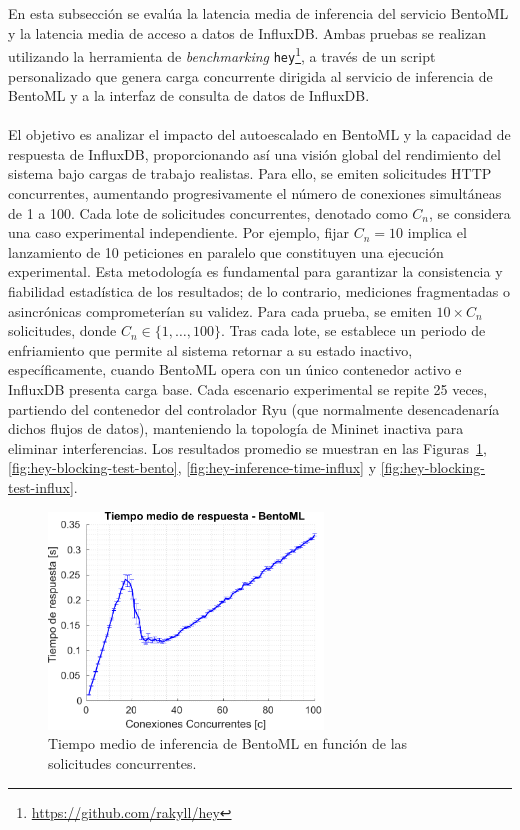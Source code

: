 En esta subsección se evalúa la latencia media de inferencia del servicio BentoML y la latencia media de acceso a datos de InfluxDB. Ambas pruebas se realizan utilizando la herramienta de \textit{benchmarking} \texttt{hey}\footnote{\url{https://github.com/rakyll/hey}}, a través de un script personalizado que genera carga concurrente dirigida al servicio de inferencia de BentoML y a la interfaz de consulta de datos de InfluxDB.\\
\\
El objetivo es analizar el impacto del autoescalado en BentoML y la capacidad de respuesta de InfluxDB, proporcionando así una visión global del rendimiento del sistema bajo cargas de trabajo realistas. Para ello, se emiten solicitudes HTTP concurrentes, aumentando progresivamente el número de conexiones simultáneas de 1 a 100. Cada lote de solicitudes concurrentes, denotado como $C_n$, se considera una caso experimental independiente. Por ejemplo, fijar $C_n = 10$ implica el lanzamiento de 10 peticiones en paralelo que constituyen una ejecución experimental. Esta metodología es fundamental para garantizar la consistencia y fiabilidad estadística de los resultados; de lo contrario, mediciones fragmentadas o asincrónicas comprometerían su validez. Para cada prueba, se emiten $10 \times C_n$ solicitudes, donde $C_n \in \{1, \ldots, 100\}$. Tras cada lote, se establece un periodo de enfriamiento que permite al sistema retornar a su estado inactivo, específicamente, cuando BentoML opera con un único contenedor activo e InfluxDB presenta carga base. Cada escenario experimental se repite 25 veces, partiendo del contenedor del controlador Ryu (que normalmente desencadenaría dichos flujos de datos), manteniendo la topología de Mininet inactiva para eliminar interferencias. Los resultados promedio se muestran en las Figuras~\ref{fig:hey-inference-time-bento}, \ref{fig:hey-blocking-test-bento}, \ref{fig:hey-inference-time-influx} y \ref{fig:hey-blocking-test-influx}.

\begin{figure}[ht!]
    \centering
    \includegraphics[width=0.65\textwidth]{fig/08_datadriven/datadriven_12.pdf}
    \caption{Tiempo medio de inferencia de BentoML en función de las solicitudes concurrentes.}
    \label{fig:hey-inference-time-bento}
\end{figure}

